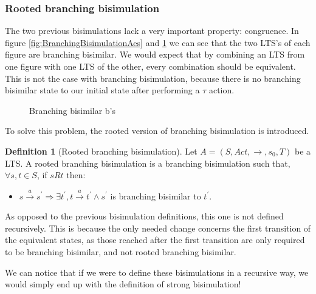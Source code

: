 \documentclass[11pt]{article}
\theoremstyle{definition}
\newtheorem{definition}{Definition}
\theoremstyle{plain}
\begin{document}
\subsubsection{Rooted branching bisimulation}

The two previous bisimulations lack a very important property: congruence. In figure \ref{fig:BranchingBisimulationAes} and \ref{fig:BranchingBisimulationBes} we can see that the two LTS's of each figure are branching bisimilar. We would expect that by combining an LTS from one figure with one LTS of the other, every combination should be equivalent. This is not the case with branching bisimulation, because there is no branching bisimilar state to our initial state after performing a $ \tau $ action.

\begin{figure} [H]
	\centering
	
	\caption{Branching bisimilar a's} \label{fig:BranchingBisimulationAes}
	\endminipage\hfill
	\centering
	
	\caption{Branching bisimilar b's} \label{fig:BranchingBisimulationBes}
	\endminipage\hfill
\end{figure}

To solve this problem, the rooted version of branching bisimulation is introduced.
\begin{definition} [Rooted branching bisimulation]
	Let $ A = (S, Act, \rightarrow, s_0, T) $ be a LTS. A rooted branching bisimulation is a branching bisimulation such that, $ \forall s,t \in S$, if $ s R t $ then:
	\begin{itemize}
		\item $ s\xrightarrow{a}s^\prime  \Rightarrow \exists t^\prime , t\xrightarrow{a}t^\prime  \wedge s^\prime $ is branching bisimilar to $ t^\prime  $.
	\end{itemize}
\end{definition}

As opposed to the previous bisimulation definitions, this one is not defined recursively. This is because the only needed change concerns the first transition of the equivalent states, as those reached after the first transition are only required to be branching bisimilar, and not rooted branching bisimilar.

We can notice that if we were to define these bisimulations in a recursive way, we would simply end up with the definition of strong bisimulation!
\end{document}
